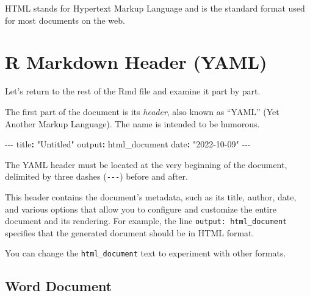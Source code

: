 \documentclass[
  letterpaper,
  DIV=11,
  numbers=noendperiod]{scrreprt}
\newenvironment{Shaded}{\begin{snugshade}}{\end{snugshade}}
\newcommand{\AttributeTok}[1]{\textcolor[rgb]{0.40,0.45,0.13}{#1}}
\newcommand{\FunctionTok}[1]{\textcolor[rgb]{0.28,0.35,0.67}{#1}}
\newcommand{\KeywordTok}[1]{\textcolor[rgb]{0.00,0.23,0.31}{\textbf{#1}}}
\newcommand{\PreprocessorTok}[1]{\textcolor[rgb]{0.68,0.00,0.00}{#1}}
\newcommand{\StringTok}[1]{\textcolor[rgb]{0.13,0.47,0.30}{#1}}
\begin{document}
\begin{tcolorbox}[enhanced jigsaw, title=\textcolor{quarto-callout-note-color}{\faInfo}\hspace{0.5em}{Vocab}, colbacktitle=quarto-callout-note-color!10!white, leftrule=.75mm, arc=.35mm, opacityback=0, bottomrule=.15mm, rightrule=.15mm, toptitle=1mm, breakable, toprule=.15mm, colback=white, coltitle=black, colframe=quarto-callout-note-color-frame, bottomtitle=1mm, titlerule=0mm, left=2mm, opacitybacktitle=0.6]

HTML stands for Hypertext Markup Language and is the standard format
used for most documents on the web.

\end{tcolorbox}

\section{R Markdown Header (YAML)}\label{r-markdown-header-yaml}

Let's return to the rest of the Rmd file and examine it part by part.

The first part of the document is its \emph{header}, also known as
``YAML'' (Yet Another Markup Language). The name is intended to be
humorous.

\begin{Shaded}
\begin{Highlighting}[]
\PreprocessorTok{{-}{-}{-}}
\FunctionTok{title}\KeywordTok{:}\AttributeTok{ }\StringTok{"Untitled"}
\FunctionTok{output}\KeywordTok{:}\AttributeTok{ html\_document}
\FunctionTok{date}\KeywordTok{:}\AttributeTok{ }\StringTok{"2022{-}10{-}09"}
\PreprocessorTok{{-}{-}{-}}
\end{Highlighting}
\end{Shaded}

The YAML header must be located at the very beginning of the document,
delimited by three dashes (\texttt{-\/-\/-}) before and after.

This header contains the document's metadata, such as its title, author,
date, and various options that allow you to configure and customize the
entire document and its rendering. For example, the line
\texttt{output:\ html\_document} specifies that the generated document
should be in HTML format.

You can change the \texttt{html\_document} text to experiment with other
formats.

\subsection{Word Document}\label{word-document}
\end{document}
